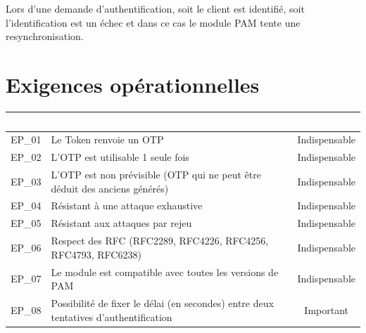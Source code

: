 \documentclass{"../../res/univ-projet"}
\begin{document}
\vspace{0.5cm}

Lors d'une demande d'authentification, soit le client est identifié, soit l'identification est un échec et dans ce cas
le module PAM tente une resynchronisation.
\clearpage
\newpage
\section{Exigences opérationnelles}
\begin{tabular}{|c|l|c|}
    \hline
    \rowcolor{gray}
    \textcolor{white}{Id} & \textcolor{white}{Intitulé} & \textcolor{white}{Priorité}\\
    \hline
    EP\_01 & Le Token renvoie un OTP & Indispensable\\
    \hline
    EP\_02 & L'OTP est utilisable 1 seule fois & Indispensable\\
    \hline
    EP\_03 & L'OTP est non prévisible (OTP qui ne peut être déduit des anciens générés) & Indispensable\\
    \hline
    EP\_04 & Résistant à une attaque exhaustive & Indispensable\\
    \hline
    EP\_05 & Résistant aux attaques par rejeu & Indispensable\\
    \hline
    EP\_06 & Respect des RFC (RFC2289, RFC4226, RFC4256, RFC4793, RFC6238) & Indispensable\\
    \hline
    EP\_07 & Le module est compatible avec toutes les versions de PAM & Indispensable\\
    \hline
    EP\_08 & Possibilité de fixer le délai (en secondes) entre deux tentatives d'authentification & Important\\
    \hline
\end{tabular}

\end{document}
